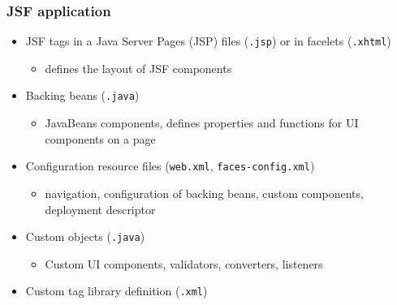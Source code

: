 \documentclass[10pt,xcolor=pdflatex]{beamer}
\begin{document}
\begin{frame}\frametitle{JSF application}
	\begin{itemize}
        \item JSF tags in a Java Server Pages (JSP) files (\texttt{.jsp}) 
    or in facelets (\texttt{.xhtml})
            \begin{itemize}
                \item defines the layout of JSF components
            \end{itemize}
        \item Backing beans (\texttt{.java})
            \begin{itemize}
                \item JavaBeans components, defines properties and functions for UI components on a page
            \end{itemize}
        \item Configuration resource files (\texttt{web.xml}, \texttt{faces-config.xml})
            \begin{itemize}
                \item navigation, configuration of backing beans, custom components, deployment descriptor
            \end{itemize}
        \item Custom objects (\texttt{.java})
            \begin{itemize}
                \item Custom UI components, validators, converters, listeners
            \end{itemize}
        \item Custom tag library definition (\texttt{.xml})
	\end{itemize}
\end{frame}
\end{document}

